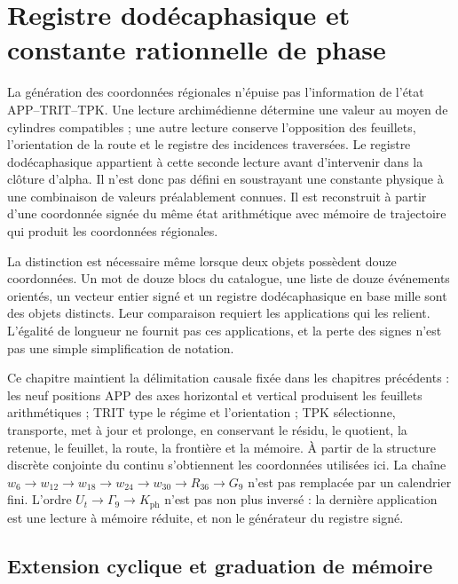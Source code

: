 \section{Registre dodécaphasique et constante rationnelle de phase}
\label{sec:k-registro}

La génération des coordonnées régionales n'épuise pas l'information de l'état APP--TRIT--TPK. Une lecture archimédienne détermine une valeur au moyen de cylindres compatibles ; une autre lecture conserve l'opposition des feuillets, l'orientation de la route et le registre des incidences traversées. Le registre dodécaphasique appartient à cette seconde lecture avant d'intervenir dans la clôture d'alpha. Il n'est donc pas défini en soustrayant une constante physique à une combinaison de valeurs préalablement connues. Il est reconstruit à partir d'une coordonnée signée du même état arithmétique avec mémoire de trajectoire qui produit les coordonnées régionales.

La distinction est nécessaire même lorsque deux objets possèdent douze
coordonnées. Un mot de douze blocs du catalogue, une liste de douze
événements orientés, un vecteur entier signé et un registre dodécaphasique en base mille sont des
objets distincts. Leur comparaison requiert les applications qui les
relient. L'égalité de longueur ne fournit pas ces applications, et la
perte des signes n'est pas une simple simplification de notation.

Ce chapitre maintient la délimitation causale fixée dans les chapitres précédents :
les neuf positions APP des axes horizontal et vertical produisent les
feuillets arithmétiques ; TRIT type le régime et l'orientation ; TPK sélectionne,
transporte, met à jour et prolonge, en conservant le résidu, le quotient, la retenue,
le feuillet, la route, la frontière et la mémoire. À partir de la structure discrète conjointe du
continu s'obtiennent les coordonnées utilisées ici. La chaîne
\(w_6\to w_{12}\to w_{18}\to w_{24}\to w_{30}\to R_{36}\to G_9\)
n'est pas remplacée par un calendrier fini. L'ordre
\(U_t\to\Gamma_9\to K_{\mathrm{ph}}\) n'est pas non plus inversé : la dernière application est une
lecture à mémoire réduite, et non le générateur du registre signé.



\subsection{Extension cyclique et graduation de mémoire}
\label{subsec:k-calendario}

